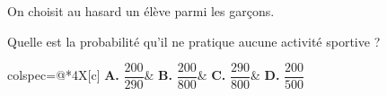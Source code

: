 	On choisit au hasard un élève parmi les garçons.

	Quelle est la probabilité qu'il ne pratique aucune activité sportive ?

	\medskip
	\begin{tblr}{colspec={@{}*{4}{X[c]}}}
		\textbf{A.} $\dfrac{200}{290}$&
		\textbf{B.} $\dfrac{200}{800}$&
		\textbf{C.} $\dfrac{290}{800}$&
		\textbf{D.} $\dfrac{200}{500}$
	\end{tblr}
